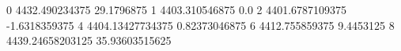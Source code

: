 0 4432.490234375 29.1796875
1 4403.310546875 0.0
2 4401.6787109375 -1.6318359375
4 4404.13427734375 0.82373046875
6 4412.755859375 9.4453125
8 4439.24658203125 35.93603515625
